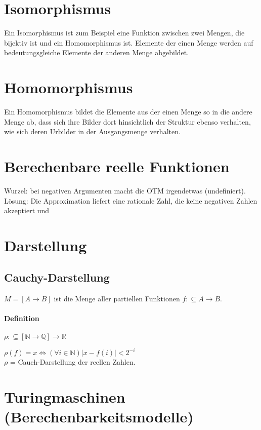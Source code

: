 \documentclass[ngerman]{scrartcl}
\begin{document}
\section{Isomorphismus}
Ein Isomorphismus ist zum Beispiel eine Funktion zwischen zwei Mengen, die bijektiv ist und ein Homomorphismus ist. Elemente der einen Menge werden auf bedeutungsgleiche Elemente der anderen Menge abgebildet.

\section{Homomorphismus}
Ein Homomorphismus bildet die Elemente aus der einen Menge so in die andere Menge ab, dass sich ihre Bilder dort hinsichtlich der Struktur ebenso verhalten, wie sich deren Urbilder in der Ausgangsmenge verhalten.

\section{Berechenbare reelle Funktionen}
Wurzel: bei negativen Argumenten macht die OTM irgendetwas (undefiniert). Lösung: Die Approximation liefert eine rationale Zahl, die keine negativen Zahlen akzeptiert und 


\section{Darstellung}

\subsection{Cauchy-Darstellung}
$ M = [A \rightarrow B] $ ist die Menge aller partiellen Funktionen $ f : \subseteq A \rightarrow B $.

\paragraph{Definition} $ \rho : \subseteq[\mathbb{N}\rightarrow\mathbb{Q}] \rightarrow \mathbb{R}$ 

\begin{center}
  $ \rho(f) = x \Leftrightarrow (\forall i \in \mathbb{N})|x-f(i)|< 2^{-i}$ \\
  $ \rho $ = Cauch-Darstellung der reellen Zahlen.
\end{center} 

\section{Turingmaschinen (Berechenbarkeitsmodelle)}
\end{document}
